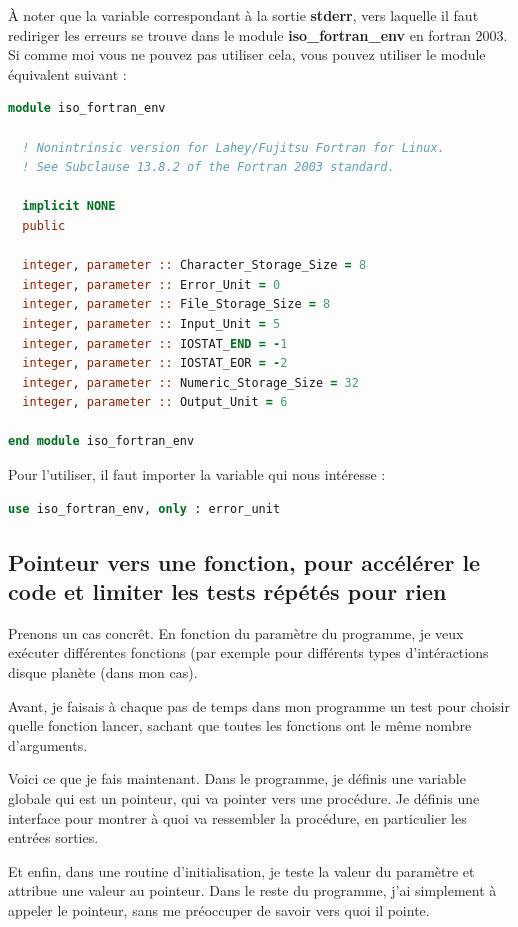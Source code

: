 \documentclass[a4paper,twoside]{article}
\begin{document}
\bigskip

À noter que la variable correspondant à la sortie \textbf{stderr}, vers laquelle il faut rediriger les erreurs se trouve dans le module \textbf{iso\_fortran\_env} en fortran 2003. Si comme moi vous ne pouvez pas utiliser cela, vous pouvez utiliser le module équivalent suivant :
\begin{lstlisting}[language=Fortran]
module iso_fortran_env

  ! Nonintrinsic version for Lahey/Fujitsu Fortran for Linux. 
  ! See Subclause 13.8.2 of the Fortran 2003 standard. 

  implicit NONE 
  public 

  integer, parameter :: Character_Storage_Size = 8 
  integer, parameter :: Error_Unit = 0 
  integer, parameter :: File_Storage_Size = 8 
  integer, parameter :: Input_Unit = 5 
  integer, parameter :: IOSTAT_END = -1 
  integer, parameter :: IOSTAT_EOR = -2 
  integer, parameter :: Numeric_Storage_Size = 32 
  integer, parameter :: Output_Unit = 6 

end module iso_fortran_env
\end{lstlisting}

Pour l'utiliser, il faut importer la variable qui nous intéresse :
\begin{lstlisting}[language=Fortran]
use iso_fortran_env, only : error_unit
\end{lstlisting}

\subsection{Pointeur vers une fonction, pour accélérer le code et limiter les tests répétés pour rien}\label{sec:pointeur-fonction}
Prenons un cas concrêt. En fonction du paramètre du programme, je veux exécuter différentes fonctions (par exemple pour différents types d'intéractions disque planète (dans mon cas). 

Avant, je faisais à chaque pas de temps dans mon programme un test pour choisir quelle fonction lancer, sachant que toutes les fonctions ont le même nombre d'arguments. 

\bigskip

Voici ce que je fais maintenant. Dans le programme, je définis une variable globale qui est un pointeur, qui va pointer vers une procédure. Je définis une interface pour montrer à quoi va ressembler la procédure, en particulier les entrées sorties. 

Et enfin, dans une routine d'initialisation, je teste la valeur du paramètre et attribue une valeur au pointeur. Dans le reste du programme, j'ai simplement à appeler le pointeur, sans me préoccuper de savoir vers quoi il pointe.
\end{document}
